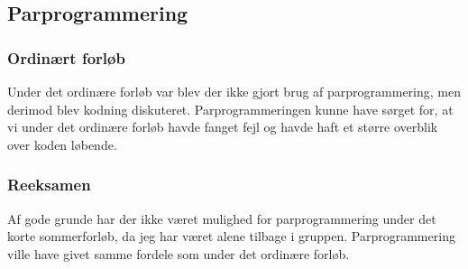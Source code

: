 \documentclass[]{article}
\begin{document}
\subsection{Parprogrammering}
\subsubsection*{Ordinært forløb}
\noindent Under det ordinære forløb var blev der ikke gjort brug af parprogrammering, men derimod blev kodning diskuteret. Parprogrammeringen kunne have sørget for, at vi under det ordinære forløb havde fanget fejl og havde haft et større overblik over koden løbende.
\subsubsection*{Reeksamen}
\noindent Af gode grunde har der ikke været mulighed for parprogrammering under det korte sommerforløb, da jeg har været alene tilbage i gruppen. Parprogrammering ville have givet samme fordele som under det ordinære forløb.
\end{document}
